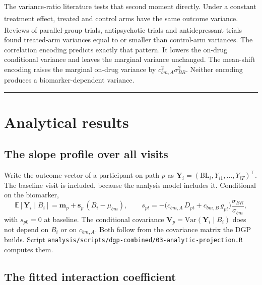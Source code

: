 \documentclass[
  11pt,
]{article}
\begin{document}
The variance-ratio literature tests that second moment directly.
Under a constant treatment effect, treated and control arms have the
same outcome variance\textsuperscript{}. Reviews of parallel-group
trials\textsuperscript{}, antipsychotic trials\textsuperscript{} and
antidepressant trials\textsuperscript{} found treated-arm variances
equal to or smaller than control-arm variances. The correlation
encoding predicts exactly that pattern. It lowers the on-drug
conditional variance and leaves the marginal variance unchanged. The
mean-shift encoding raises the marginal on-drug variance by
\(c_{bm,A}^2\sigma_{BR}^2\). Neither encoding produces a
biomarker-dependent variance.

\bigskip\noindent

\rule{\textwidth}{0.4pt}\bigskip

\section{Analytical results}\label{sec-analytic}

\subsection{The slope profile over all visits}\label{the-slope-profile-over-all-visits}

Write the outcome vector of a participant on path \(p\) as
\(\mathbf{Y}_i = (\mathrm{BL}_i, Y_{i1}, \ldots, Y_{iT})^\top\). The
baseline visit is included, because the analysis model includes it.
Conditional on the biomarker,
\begin{equation}
\mathbb{E}[\mathbf{Y}_i \mid B_i] = \mathbf{m}_p
  + \mathbf{s}_p\,(B_i - \mu_{bm}),
\qquad
s_{pt} = -\bigl(c_{bm,A}\, D_{pt} + c_{bm,B}\, g_{pt}\bigr)
  \frac{\sigma_{BR}}{\sigma_{bm}},
\label{eq:slope}
\end{equation}
with \(s_{p0} = 0\) at baseline. The conditional covariance
\(\mathbf{V}_p = \mathrm{Var}(\mathbf{Y}_i \mid B_i)\) does not depend
on \(B_i\) or on \(c_{bm,A}\). Both follow from the covariance matrix the
DGP builds. Script \texttt{analysis/scripts/dgp-combined/03-analytic-projection.R}
computes them.

\subsection{The fitted interaction coefficient}\label{the-fitted-interaction-coefficient}
\end{document}
